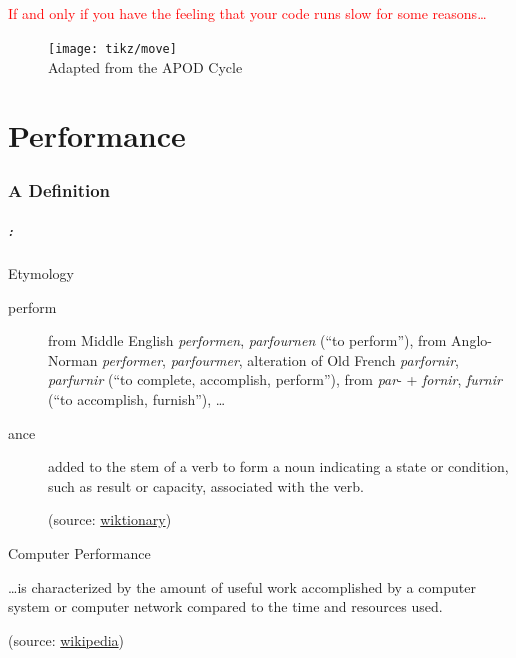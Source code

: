 \documentclass[9pt,xcolor=table]{beamer}
\begin{document}
\begin{frame}
\frametitle{\insertsection{}}
\begin{center}
  \huge\textcolor{red}{If and only if you have the feeling that your code runs slow for some reasons\dots}
\end{center}
\begin{figure}[htb]
\texttt{[image: tikz/move]}\\[6pt]
Adapted from the APOD Cycle \cite{CUDABestPractises}
\end{figure}
\end{frame}

\part{Performance}
\section{A Definition}
\begin{frame}
\frametitle{\insertsectionhead{} : \insertpart{}
}
\vfill
\begin{block}{Etymology}
  \begin{description}
  \item[perform] from Middle English \textit{performen}, \textit{parfournen} (``to perform''), from Anglo-Norman \textit{performer}, \textit{parfourmer}, alteration of Old French \textit{parfornir}, \textit{parfurnir} (``to complete, accomplish, perform''), from \textit{par}- + \textit{fornir}, \textit{furnir} (``to accomplish, furnish''), \dots
  \item[ance] added to the stem of a verb to form a noun indicating a state or condition, such as result or capacity, associated with the verb.\\
    \begin{flushright}
      \small(source: \href{http://en.wiktionary.org/wiki/perform}{wiktionary})
    \end{flushright}
  \end{description}
\end{block}
\vfill\pause
\begin{block}{Computer Performance}
  \begin{center}\large
    \dots is characterized by the amount of \alert<2->{useful work} accomplished by a computer system or computer network compared to the \alert<3->{time} and \alert<4->{resources} used.\\
  \end{center}
  \begin{flushright}
    \small(source: \href{http://en.wikipedia.org/wiki/Computer_performance}{wikipedia})
  \end{flushright}

  \end{block}
\vfill
\end{frame}
\end{document}

